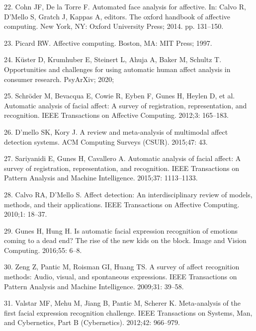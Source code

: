 \documentclass[10pt,letterpaper]{article}
\begin{document}
\leavevmode\hypertarget{ref-cohn2014automated}{}%
22. Cohn JF, De la Torre F. Automated face analysis for affective. In: Calvo R, D'Mello S, Gratch J, Kappas A, editors. The oxford handbook of affective computing. New York, NY: Oxford University Press; 2014. pp. 131--150.

\leavevmode\hypertarget{ref-picard1997affective}{}%
23. Picard RW. Affective computing. Boston, MA: MIT Press; 1997.

\leavevmode\hypertarget{ref-kuster2020opportunities}{}%
24. Küster D, Krumhuber E, Steinert L, Ahuja A, Baker M, Schultz T. Opportunities and challenges for using automatic human affect analysis in consumer research. PsyArXiv; 2020;

\leavevmode\hypertarget{ref-schroder2012automatic}{}%
25. Schröder M, Bevacqua E, Cowie R, Eyben F, Gunes H, Heylen D, et al. Automatic analysis of facial affect: A survey of registration, representation, and recognition. IEEE Transactions on Affective Computing. 2012;3: 165--183.

\leavevmode\hypertarget{ref-d2015review}{}%
26. D'mello SK, Kory J. A review and meta-analysis of multimodal affect detection systems. ACM Computing Surveys (CSUR). 2015;47: 43.

\leavevmode\hypertarget{ref-sariyanidi2015automatic}{}%
27. Sariyanidi E, Gunes H, Cavallero A. Automatic analysis of facial affect: A survey of registration, representation, and recognition. IEEE Transactions on Pattern Analysis and Machine Intelligence. 2015;37: 1113--1133.

\leavevmode\hypertarget{ref-calvo2010affect}{}%
28. Calvo RA, D'Mello S. Affect detection: An interdisciplinary review of models, methods, and their applications. IEEE Transactions on Affective Computing. 2010;1: 18--37.

\leavevmode\hypertarget{ref-gunes2016automatic}{}%
29. Gunes H, Hung H. Is automatic facial expression recognition of emotions coming to a dead end? The rise of the new kids on the block. Image and Vision Computing. 2016;55: 6--8.

\leavevmode\hypertarget{ref-zeng2009survey}{}%
30. Zeng Z, Pantic M, Roisman GI, Huang TS. A survey of affect recognition methods: Audio, visual, and spontaneous expressions. IEEE Transactions on Pattern Analysis and Machine Intelligence. 2009;31: 39--58.

\leavevmode\hypertarget{ref-valstar2012meta}{}%
31. Valstar MF, Mehu M, Jiang B, Pantic M, Scherer K. Meta-analysis of the first facial expression recognition challenge. IEEE Transactions on Systems, Man, and Cybernetics, Part B (Cybernetics). 2012;42: 966--979.
\end{document}
